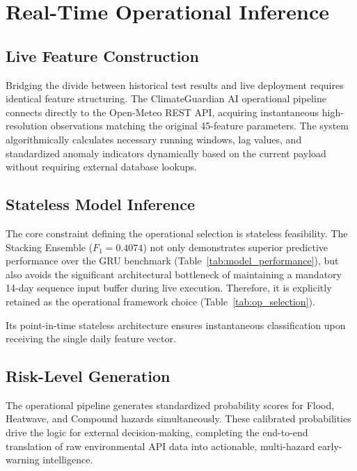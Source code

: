 \section{Real-Time Operational Inference}
\label{sec:realtime}
\subsection{Live Feature Construction}
Bridging the divide between historical test results and live deployment requires identical feature structuring. The ClimateGuardian AI operational pipeline connects directly to the Open-Meteo REST API, acquiring instantaneous high-resolution observations matching the original 45-feature parameters. The system algorithmically calculates necessary running windows, lag values, and standardized anomaly indicators dynamically based on the current payload without requiring external database lookups. 

\subsection{Stateless Model Inference}
The core constraint defining the operational selection is stateless feasibility. The Stacking Ensemble ($F_1 = 0.4074$) not only demonstrates superior predictive performance over the GRU benchmark (Table~\ref{tab:model_performance}), but also avoids the significant architectural bottleneck of maintaining a mandatory 14-day sequence input buffer during live execution. Therefore, it is explicitly retained as the operational framework choice (Table~\ref{tab:op_selection}).

\begin{table}[htbp]
\caption{Operational Model Selection}
\begin{center}
\label{tab:op_selection}
\end{center}
\end{table}
 Its point-in-time stateless architecture ensures instantaneous classification upon receiving the single daily feature vector.

\subsection{Risk-Level Generation}
The operational pipeline generates standardized probability scores for Flood, Heatwave, and Compound hazards simultaneously. These calibrated probabilities drive the logic for external decision-making, completing the end-to-end translation of raw environmental API data into actionable, multi-hazard early-warning intelligence.
